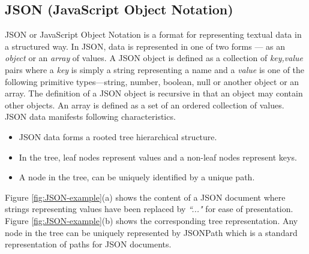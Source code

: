 \subsection{JSON (JavaScript Object Notation)}
\label{sec:background}


JSON or JavaScript Object Notation is a format for representing textual data in a structured way.  In JSON, data is represented in one of two forms --- as an \emph{object} or an \emph{array} of values. A JSON object is defined as a collection of \emph {key,value} pairs where a \emph {key} is simply a string representing a name  and a \emph {value}  is one of the following primitive types---string, number, boolean, null or another object or an array. The definition of a JSON object is recursive in that an object may contain other objects. An array is defined as a set of an ordered collection of  values. JSON data  manifests following characteristics.

\begin{itemize}

  \item JSON data forms a rooted tree hierarchical structure. 

  \item In the tree, leaf nodes represent values and a non-leaf nodes represent keys.

  \item A node in the tree, can be uniquely identified by a unique path.
\end{itemize}

Figure \ref{fig:JSON-example}(a) shows the content of a JSON document where strings representing values have been replaced by \textit{``..."} for ease of presentation.  Figure \ref{fig:JSON-example}(b) shows the corresponding tree representation. Any node in the tree can be uniquely represented by  JSONPath \cite{JSONPath} which is a standard representation of paths for JSON documents.


















